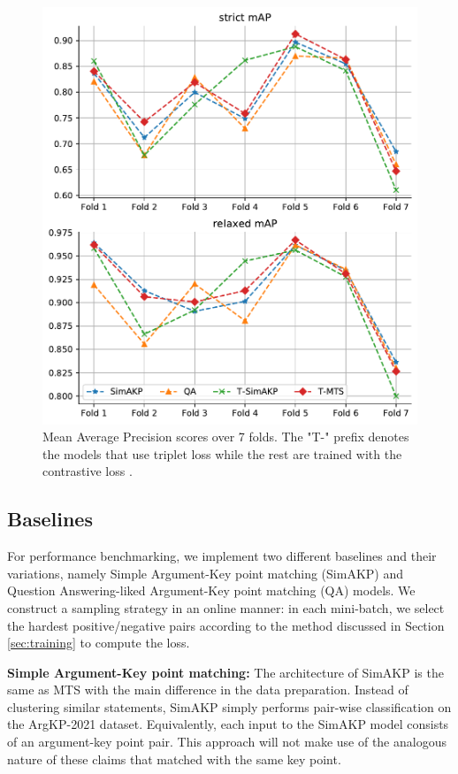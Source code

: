 \begin{figure}[t]
\centering
\includegraphics[scale=0.49]{figures/7-folds.pdf}
\caption{Mean Average Precision scores over 7 folds. The "T-" prefix denotes the models that use triplet loss \citep{dong2018triplet} while the rest are trained with the contrastive loss \citep{chopra2005learning}.}
\label{fig:7-folds}
\end{figure}

\subsection{Baselines}

For performance benchmarking, we implement two different baselines and their variations, namely Simple Argument-Key point matching (SimAKP) and Question Answering-liked Argument-Key point matching (QA) models. We construct a sampling strategy in an online manner: in each mini-batch, we select the hardest positive/negative pairs according to the method discussed in Section \ref{sec:training} to compute the loss.

\textbf{Simple Argument-Key point matching:} The architecture of SimAKP is the same as MTS with the main difference in the data preparation. Instead of clustering similar statements, SimAKP simply performs pair-wise classification on the ArgKP-2021 dataset. Equivalently, each input to the SimAKP model consists of an argument-key point pair. This approach will not make use of the analogous nature of these claims that matched with the same key point.

